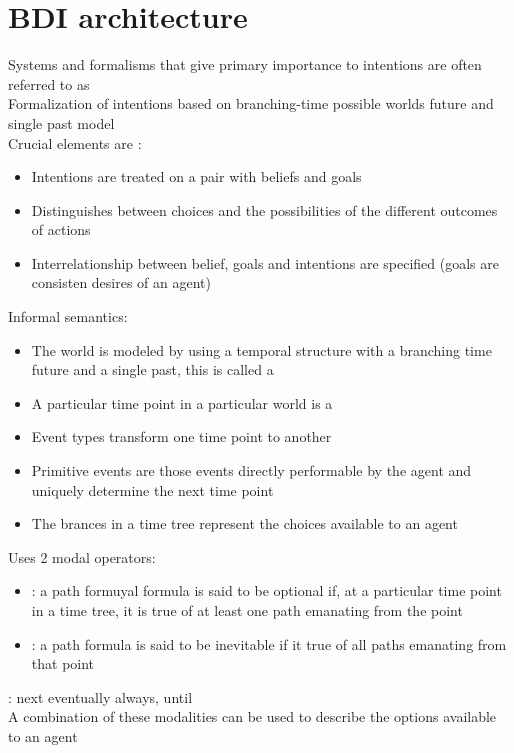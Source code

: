 \section{BDI architecture}
Systems and formalisms that give primary importance to intentions are often referred to as \\
Formalization of intentions based on branching-time possible worlds future and single past model\\
Crucial elements are :
\begin{itemize}
\item Intentions are treated on a pair with beliefs and goals
\item Distinguishes between choices and the possibilities of the different outcomes of actions
\item Interrelationship between belief, goals and intentions are specified (goals are consisten desires of an agent)
\end{itemize}
Informal semantics:
\begin{itemize}
\item The world is modeled by using a temporal structure with a branching time future and a single past, this is called a 
\item A particular time point in a particular world is a 
\item Event types transform one time point to another
\item Primitive events are those events directly performable by the agent and uniquely determine the next time point
\item The brances in a time tree represent the choices available to an agent
\end{itemize}
Uses 2 modal operators:
\begin{itemize}
\item {}: a path formuyal formula is said to be optional if, at a particular time point in a time tree, it is true of at least one path emanating from the point
\item {}: a path formula is said to be inevitable if it true of all paths emanating from that point
\end{itemize}
: next eventually always, until\\
A combination of these modalities can be used to describe the options available to an agent\\

